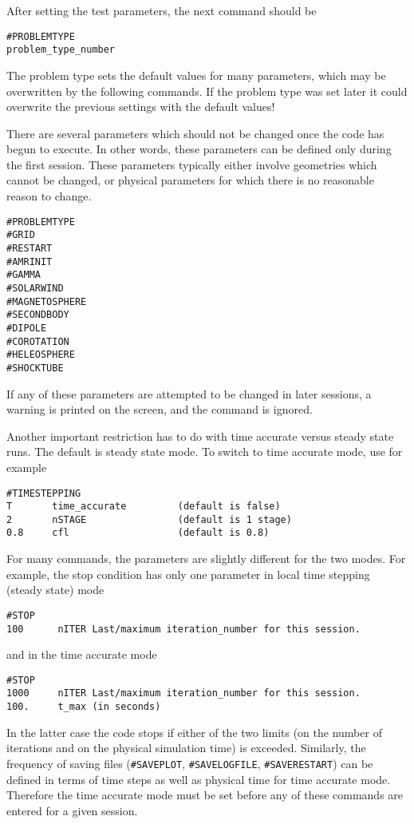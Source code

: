 After setting the test parameters, the next command should be
\begin{verbatim}
#PROBLEMTYPE
problem_type_number
\end{verbatim}
The problem type sets the default values for many parameters,
which may be overwritten by the following commands. If the 
problem type was set later it could overwrite the previous
settings with the default values!

There are several parameters which should not be changed once the code has begun
to execute.  In other words, these parameters can be defined only during the first
session.  These parameters typically either involve geometries which 
cannot be changed, or 
physical parameters for which there is no reasonable reason to change.
\begin{verbatim}
#PROBLEMTYPE 
#GRID 
#RESTART
#AMRINIT
#GAMMA
#SOLARWIND
#MAGNETOSPHERE
#SECONDBODY
#DIPOLE
#COROTATION
#HELEOSPHERE
#SHOCKTUBE
\end{verbatim}
If any of these parameters are attempted to be changed in later sessions, 
a warning is printed on the screen, and the command is ignored.

Another important restriction has to do with time accurate versus
steady state runs. The default is steady state mode. To switch
to time accurate mode, use for example
\begin{verbatim}
#TIMESTEPPING
T       time_accurate         (default is false)
2       nSTAGE                (default is 1 stage)
0.8     cfl                   (default is 0.8)
\end{verbatim}
For many commands, the parameters are slightly
different for the two modes. For example, the stop condition has
only one parameter in local time stepping (steady state) mode
\begin{verbatim}
#STOP
100      nITER Last/maximum iteration_number for this session.
\end{verbatim}
and in the time accurate mode
\begin{verbatim}
#STOP
1000     nITER Last/maximum iteration_number for this session.
100.     t_max (in seconds)
\end{verbatim}
In the latter case the code stops if either of the two limits 
(on the number of iterations and on the physical simulation time) is exceeded.
Similarly, the frequency of saving files 
({\tt \#SAVEPLOT}, {\tt \#SAVELOGFILE}, {\tt \#SAVERESTART})
 can be defined in terms of time
steps as well as physical time for time accurate mode. 
Therefore the time accurate mode must be set before any of these
commands are entered for a given session. 

